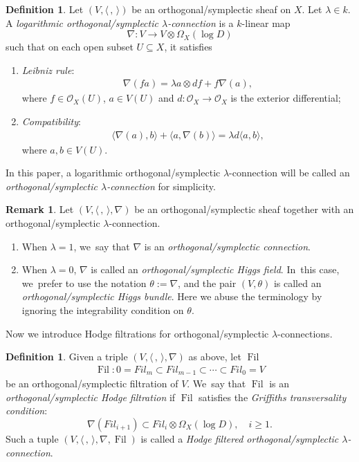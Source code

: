 \documentclass[11pt]{article}
\numberwithin{equation}{section}
\newcommand{\Fil}{\textit{Fil}}
\newcommand{\lconnection}{$\lambda$\nobreakdash-con\-nec\-tion\xspace}
\newcommand{\lconnections}{$\lambda$\nobreakdash-con\-nec\-tions\xspace}
\DeclareMathOperator{\Filt}{Fil}
\theoremstyle{plain}
\theoremstyle{definition}
\newtheorem{defn}[thm]{Definition}
\newtheorem{rem}[thm]{Remark}
\begin{document}
\begin{defn}\label{defn_lambda_conn}
Let $(V,\langle \,, \, \rangle)$ be an orthogonal/symplectic sheaf on $X$. Let $\lambda\in k$. A \emph{logarithmic orthogonal/symplectic \lconnection} is a $k$-linear map
\[
\nabla: V \to V\otimes \Omega_X(\log D)
\]
such that on each open subset $U \subseteq X$, it satisfies
\begin{enumerate}
\item \emph{Leibniz rule}:\vspace*{-3pt}
\begin{align*}
\nabla (fa)=\lambda a\otimes df+f\nabla(a),
\end{align*}
where $f\in \mathcal{O}_X(U)$, $a \in V(U)$ and $d: \mathcal{O}_X \to \mathcal{O}_X$ is the exterior differential;

\item \emph{Compatibility}:\vspace*{-3pt}
\begin{align*}
\langle \nabla(a),b \rangle+\langle a,\nabla(b) \rangle=\lambda d\langle a,b \rangle,
\end{align*}
where $a,b \in V(U)$.
\end{enumerate}
In this paper, a logarithmic orthogonal/symplectic \lconnection will be called an \emph{orthogonal/symplectic \lconnection} for simplicity.
\end{defn}

\begin{rem}
Let $(V,\langle \,, \, \rangle,\nabla)$ be an orthogonal/symplectic sheaf together with an orthogonal/symplectic \lconnection. 
\begin{enumerate}
\item When $\lambda=1$, we~say that $\nabla$ is an \emph{orthogonal/symplectic connection}.

\item When $\lambda=0$, $\nabla$ is called an \emph{orthogonal/symplectic Higgs field}. In~this case, we~prefer to use the notation $\theta := \nabla$, and the pair $(V,\theta)$ is called an \emph{orthogonal/symplectic Higgs bundle}. Here we abuse the terminology by ignoring the integrability condition on $\theta$.
\end{enumerate}
\end{rem}

Now we introduce Hodge filtrations for orthogonal/symplectic \lconnections.
\begin{defn}\label{defn_na_Hod_fil}
Given a triple $(V,\langle \,, \, \rangle,\nabla)$ as above, let $\Filt$\vspace*{-3pt}
\begin{align*}
\Filt: 0=\Fil_m \subset \Fil_{m-1} \subset \cdots \subset \Fil_0=V
\end{align*}
be an orthogonal/symplectic filtration of $V$. We~say that $\Filt $ is an \emph{orthogonal/sym\-plec\-tic Hodge filtration} if $\Filt $ satisfies the \emph{Griffiths transversality condition}:\vspace*{-3pt}
\[
\nabla(\Fil_{i+1})\subset \Fil_{i}\otimes \Omega_X(\log D), \quad i \geq 1.
\]
Such a tuple $(V, \langle \,, \, \rangle, \nabla, \Filt)$ is called a \emph{Hodge filtered orthogonal/symplectic \lconnection}.
\end{defn}
\end{document}
